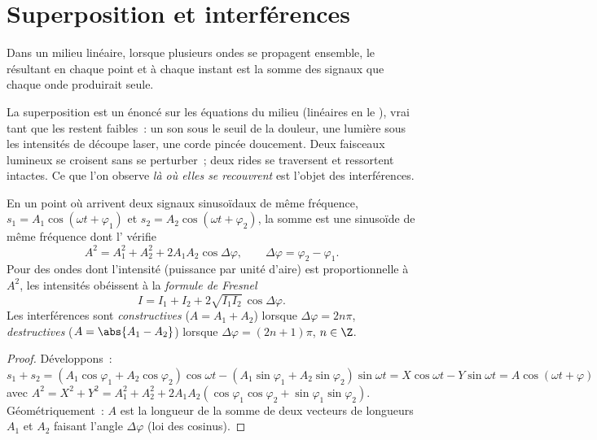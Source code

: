 \section{Superposition et interférences}

\begin{theorem}[Superposition]\label{thm:b1:wave-propagation:superposition}
Dans un milieu linéaire, lorsque plusieurs ondes se propagent ensemble,
le  résultant en chaque point et à chaque instant est la somme des
signaux que chaque onde produirait seule.
\end{theorem}
\admitted

\begin{remark}[Linéarité]\label{rem:b1:wave-propagation:linearity}
La superposition est un énoncé sur les équations du milieu (linéaires en
le ), vrai tant que les  restent faibles~: un son sous
le seuil de la douleur, une lumière sous les intensités de découpe
laser, une corde pincée doucement. Deux faisceaux lumineux se croisent
sans se perturber~; deux rides se traversent et ressortent intactes. Ce
que l'on observe \emph{là où elles se recouvrent} est l'objet des
interférences.
\end{remark}

\begin{theorem}\label{thm:b1:wave-propagation:fresnel}
En un point où arrivent deux signaux sinusoïdaux de même fréquence,
$s_1 = A_1\cos(\omega t + \varphi_1)$ et $s_2 = A_2\cos(\omega t + \varphi_2)$,
la somme est une sinusoïde de même fréquence dont l' vérifie
\[
A^2 = A_1^2 + A_2^2 + 2A_1A_2\cos\Delta\varphi,
\qquad \Delta\varphi = \varphi_2 - \varphi_1 .
\]
Pour des ondes dont l'intensité (puissance par unité d'aire) est
proportionnelle à $A^2$, les intensités obéissent à la \emph{formule de Fresnel}
\[
I = I_1 + I_2 + 2\sqrt{I_1 I_2}\,\cos\Delta\varphi .
\]
Les interférences sont \emph{constructives} ($A = A_1 + A_2$) lorsque
$\Delta\varphi = 2n\pi$, \emph{destructives} ($A = \abs{A_1 - A_2}$)
lorsque $\Delta\varphi = (2n + 1)\pi$, $n \in \Z$.
\end{theorem}

\begin{proof}
Développons~: $s_1 + s_2 = (A_1\cos\varphi_1 + A_2\cos\varphi_2)\cos\omega t -
(A_1\sin\varphi_1 + A_2\sin\varphi_2)\sin\omega t = X\cos\omega t -
Y\sin\omega t = A\cos(\omega t + \varphi)$ avec $A^2 = X^2 + Y^2 =
A_1^2 + A_2^2 + 2A_1A_2(\cos\varphi_1\cos\varphi_2 + \sin\varphi_1\sin\varphi_2)$.
Géométriquement~: $A$ est la longueur de la somme de deux vecteurs de
longueurs $A_1$ et $A_2$ faisant l'angle $\Delta\varphi$ (loi des cosinus).
\end{proof}

